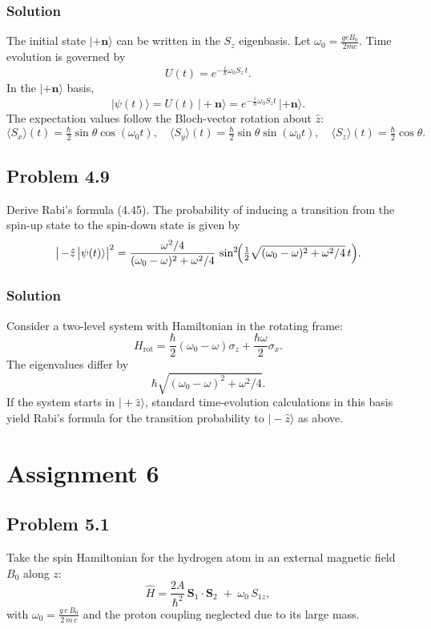 \documentclass[twocolumn]{article}
\begin{document}
\begin{spacing}{1}
\subsubsection*{Solution}
The initial state $|+\mathbf{n}\rangle$ can be written in the $S_z$ eigenbasis. Let $\omega_0 = \frac{g e B_0}{2 m c}$. Time evolution is governed by
\[
U(t) = e^{-\tfrac{i}{\hbar} \omega_0 S_z\,t}.
\]
In the $|+\mathbf{n}\rangle$ basis, 
\[
|\psi(t)\rangle 
= U(t)\,|+\mathbf{n}\rangle
= e^{-\tfrac{i}{\hbar}\omega_0 S_z t}\,|+\mathbf{n}\rangle.
\]
The expectation values follow the Bloch-vector rotation about $\hat{z}$:
\(
\langle S_x\rangle(t) 
= \tfrac{\hbar}{2}\sin\theta \cos(\omega_0 t), 
\quad
\langle S_y\rangle(t) 
= \tfrac{\hbar}{2}\sin\theta \sin(\omega_0 t),
\quad
\langle S_z\rangle(t) 
= \tfrac{\hbar}{2}\cos\theta.
\)

\subsection{Problem 4.9}
Derive Rabi's formula (4.45). The probability of inducing a transition from the spin-up state to the spin-down state is given by
\[
\bigl|\,-\hat{z}\,\bigl|\psi(t)\rangle\bigr|^2 
= \frac{\omega^2/4}{(\omega_0 - \omega)^2 + \omega^2/4}
\,\sin^2\!\Bigl(\tfrac{1}{2}\sqrt{(\omega_0-\omega)^2 + \omega^2/4}\,t\Bigr).
\]

\subsubsection*{Solution}
Consider a two-level system with Hamiltonian in the rotating frame:
\[
H_\text{rot} 
= \frac{\hbar}{2}(\omega_0 - \omega)\sigma_z 
+ \frac{\hbar \omega}{2}\sigma_x.
\]
The eigenvalues differ by 
\[
\hbar\sqrt{(\omega_0-\omega)^2 + \omega^2/4}.
\]
If the system starts in $|\!+\hat{z}\rangle$, standard time-evolution calculations in this basis yield Rabi's formula for the transition probability to $|\!-\hat{z}\rangle$ as above.

\section{Assignment 6}

\subsection{Problem 5.1}
Take the spin Hamiltonian for the hydrogen atom in an external magnetic field $B_0$ along $z$:
\[
\hat{H} 
= \frac{2A}{\hbar^2}\,\mathbf{S}_1 \cdot \mathbf{S}_2 \;+\; \omega_0\,S_{1z},
\]
with 
\(
\omega_0 
= \frac{g\,e\,B_0}{2\,m\,c}
\)
and the proton coupling neglected due to its large mass.


\end{spacing}
\end{document}
